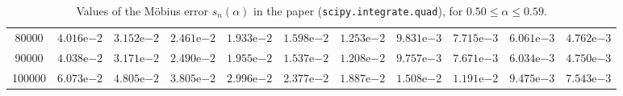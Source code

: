 \begin{table}[ht!]
{\begin{tabular}{|c|c|c|c|c|c|c|c|c|c|c|}
80000  & $4.016\mathrm{e}{-2}$ & $3.152\mathrm{e}{-2}$ & $2.461\mathrm{e}{-2}$ & $1.933\mathrm{e}{-2}$ & $1.598\mathrm{e}{-2}$ & $1.253\mathrm{e}{-2}$ & $9.831\mathrm{e}{-3}$ & $7.715\mathrm{e}{-3}$ & $6.061\mathrm{e}{-3}$ & $4.762\mathrm{e}{-3}$ \\
90000  & $4.038\mathrm{e}{-2}$ & $3.171\mathrm{e}{-2}$ & $2.490\mathrm{e}{-2}$ & $1.955\mathrm{e}{-2}$ & $1.537\mathrm{e}{-2}$ & $1.208\mathrm{e}{-2}$ & $9.757\mathrm{e}{-3}$ & $7.671\mathrm{e}{-3}$ & $6.034\mathrm{e}{-3}$ & $4.750\mathrm{e}{-3}$ \\
100000 & $6.073\mathrm{e}{-2}$ & $4.805\mathrm{e}{-2}$ & $3.805\mathrm{e}{-2}$ & $2.996\mathrm{e}{-2}$ & $2.377\mathrm{e}{-2}$ & $1.887\mathrm{e}{-2}$ & $1.508\mathrm{e}{-2}$ & $1.191\mathrm{e}{-2}$ & $9.475\mathrm{e}{-3}$ & $7.543\mathrm{e}{-3}$ \\
\hline
\end{tabular}}
\caption{Values of the M\"obius error $s_n(\alpha)$ in the paper (\texttt{scipy.integrate.quad}), for $0.50 \leq \alpha \leq 0.59$.}
\label{tab:alpha05-py}
\end{table}

